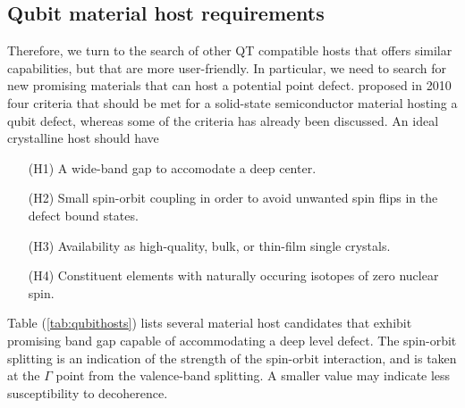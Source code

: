 \subsection{Qubit material host requirements}
\label{ssec:qubit-material-host-requirements}
Therefore, we turn to the search of other QT compatible hosts that offers similar capabilities, but that are more user-friendly. In particular, we need to search for new promising materials that can host a potential point defect. \citeauthor{Weber2010} \cite{Weber2010} proposed in 2010 four criteria that should be met for a solid-state semiconductor material hosting a qubit defect, whereas some of the criteria has already been discussed. An ideal crystalline host should have \cite{Weber2010}
\begin{itemize}
  \item[(H1)] A wide-band gap to accomodate a deep center.
  \item[(H2)] Small spin-orbit coupling in order to avoid unwanted spin flips in the defect bound states.
  \item[(H3)] Availability as high-quality, bulk, or thin-film single crystals.
  \item[(H4)] Constituent elements with naturally occuring isotopes of zero nuclear spin.
\end{itemize}


\noindent Table (\ref{tab:qubithosts}) lists several material host candidates that exhibit promising band gap capable of accommodating a deep level defect. The spin-orbit splitting is an indication of the strength of the spin-orbit interaction, and is taken at the $\Gamma$ point from the valence-band splitting. A smaller value may indicate less susceptibility to decoherence.

